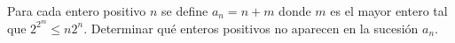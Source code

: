 Para cada entero positivo $n$ se define $a_n = n + m$ donde $m$ es el mayor entero tal que $2^{2^m} \leq n2^n$. Determinar qué enteros positivos no aparecen en la sucesión $a_n$.
